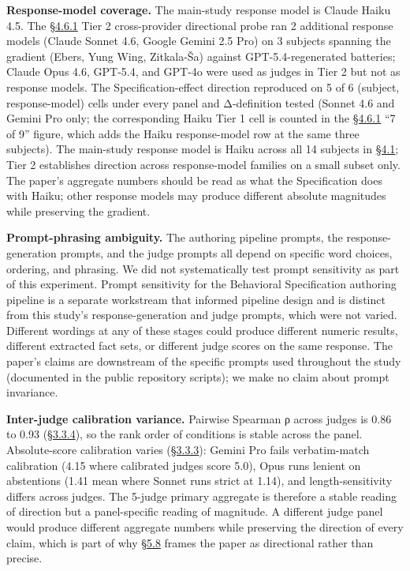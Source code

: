 \textbf{Response-model coverage.} The main-study response model is
Claude Haiku 4.5. The \hyperref[cross-provider-response-generation-tier-2-replication]{§4.6.1} Tier 2 cross-provider directional probe ran
2 additional response models (Claude Sonnet 4.6, Google Gemini 2.5 Pro)
on 3 subjects spanning the gradient (Ebers, Yung Wing, Zitkala-Ša)
against GPT-5.4-regenerated batteries; Claude Opus 4.6, GPT-5.4, and
GPT-4o were used as judges in Tier 2 but not as response models. The
Specification-effect direction reproduced on 5 of 6 (subject,
response-model) cells under every panel and Δ-definition tested (Sonnet
4.6 and Gemini Pro only; the corresponding Haiku Tier 1 cell is counted
in the \hyperref[cross-provider-response-generation-tier-2-replication]{§4.6.1} ``7 of 9'' figure, which adds the Haiku response-model row
at the same three subjects). The main-study response model is Haiku
across all 14 subjects in \hyperref[the-cross-subject-gradient-and-its-per-question-mechanism]{§4.1}; Tier 2 establishes direction across
response-model families on a small subset only. The paper's aggregate
numbers should be read as what the Specification does with Haiku; other
response models may produce different absolute magnitudes while
preserving the gradient.

\textbf{Prompt-phrasing ambiguity.} The authoring pipeline prompts, the
response-generation prompts, and the judge prompts all depend on
specific word choices, ordering, and phrasing. We did not systematically
test prompt sensitivity as part of this experiment. Prompt sensitivity
for the Behavioral Specification authoring pipeline is a separate
workstream that informed pipeline design and is distinct from this
study's response-generation and judge prompts, which were not varied.
Different wordings at any of these stages could produce different
numeric results, different extracted fact sets, or different judge
scores on the same response. The paper's claims are downstream of the
specific prompts used throughout the study (documented in the public
repository scripts); we make no claim about prompt invariance.

\textbf{Inter-judge calibration variance.} Pairwise Spearman ρ across
judges is 0.86 to 0.93 (\hyperref[inter-judge-agreement]{§3.3.4}), so the rank order of conditions is
stable across the panel. Absolute-score calibration varies (\hyperref[calibration]{§3.3.3}):
Gemini Pro fails verbatim-match calibration (4.15 where calibrated
judges score 5.0), Opus runs lenient on abstentions (1.41 mean where
Sonnet runs strict at 1.14), and length-sensitivity differs across
judges. The 5-judge primary aggregate is therefore a stable reading of
direction but a panel-specific reading of magnitude. A different judge
panel would produce different aggregate numbers while preserving the
direction of every claim, which is part of why \hyperref[closing-remarks]{§5.8} frames the paper as
directional rather than precise.

